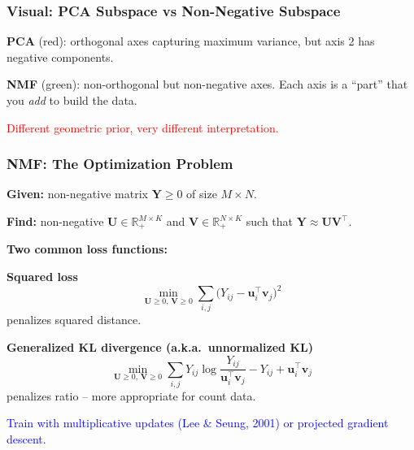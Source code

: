 \documentclass[notes,11pt, aspectratio=169]{beamer}
\newcommand{\vu}{\mathbf{u}}
\newcommand{\vv}{\mathbf{v}}
\newcommand{\vU}{\mathbf{U}}
\newcommand{\vV}{\mathbf{V}}
\newcommand{\vY}{\mathbf{Y}}
\newcommand{\R}{\mathbb{R}}
\begin{document}
\begin{frame}
\frametitle{Visual: PCA Subspace vs Non-Negative Subspace}

\begin{center}
\end{center}

\vspace{6pt}
\textbf{PCA} (red): orthogonal axes capturing maximum variance, but axis 2 has negative components.

\vspace{4pt}
\textbf{NMF} (green): non-orthogonal but non-negative axes. Each axis is a ``part'' that you \emph{add} to build the data.

\textcolor{red}{Different geometric prior, very different interpretation.}
\end{frame}

\begin{frame}
\frametitle{NMF: The Optimization Problem}

\textbf{Given:} non-negative matrix $\vY \geq 0$ of size $M \times N$.

\vspace{4pt}
\textbf{Find:} non-negative $\vU \in \R_{+}^{M \times K}$ and $\vV \in \R_{+}^{N \times K}$ such that $\vY \approx \vU \vV^\top$.

\vspace{8pt}
\textbf{Two common loss functions:}

\vspace{4pt}
\textbf{Squared loss}
\[
    \min_{\vU \geq 0,\, \vV \geq 0} \sum_{i,j} \bigl(Y_{ij} - \vu_i^\top \vv_j\bigr)^2
\]
penalizes squared distance.

\vspace{8pt}
\textbf{Generalized KL divergence (a.k.a.\ unnormalized KL)}
\[
    \min_{\vU \geq 0,\, \vV \geq 0} \sum_{i,j} Y_{ij} \log \frac{Y_{ij}}{\vu_i^\top \vv_j} - Y_{ij} + \vu_i^\top \vv_j
\]
penalizes ratio -- more appropriate for count data.

\vspace{4pt}
\textcolor{blue}{Train with multiplicative updates (Lee \& Seung, 2001) or projected gradient descent.}
\end{frame}
\end{document}
